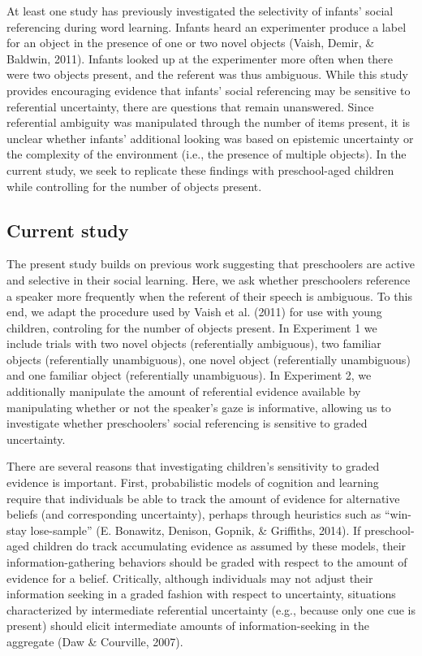 \documentclass[english,man]{apa6}
\theoremstyle{definition}
\theoremstyle{definition}
\theoremstyle{definition}
\theoremstyle{remark}
\begin{document}
At least one study has previously investigated the selectivity of
infants' social referencing during word learning. Infants heard an
experimenter produce a label for an object in the presence of one or two
novel objects (Vaish, Demir, \& Baldwin, 2011). Infants looked up at the
experimenter more often when there were two objects present, and the
referent was thus ambiguous. While this study provides encouraging
evidence that infants' social referencing may be sensitive to
referential uncertainty, there are questions that remain unanswered.
Since referential ambiguity was manipulated through the number of items
present, it is unclear whether infants' additional looking was based on
epistemic uncertainty or the complexity of the environment (i.e., the
presence of multiple objects). In the current study, we seek to
replicate these findings with preschool-aged children while controlling
for the number of objects present.

\subsection{Current study}\label{current-study}

The present study builds on previous work suggesting that preschoolers
are active and selective in their social learning. Here, we ask whether
preschoolers reference a speaker more frequently when the referent of
their speech is ambiguous. To this end, we adapt the procedure used by
Vaish et al. (2011) for use with young children, controling for the
number of objects present. In Experiment 1 we include trials with two
novel objects (referentially ambiguous), two familiar objects
(referentially unambiguous), one novel object (referentially
unambiguous) and one familiar object (referentially unambiguous). In
Experiment 2, we additionally manipulate the amount of referential
evidence available by manipulating whether or not the speaker's gaze is
informative, allowing us to investigate whether preschoolers' social
referencing is sensitive to graded uncertainty.

There are several reasons that investigating children's sensitivity to
graded evidence is important. First, probabilistic models of cognition
and learning require that individuals be able to track the amount of
evidence for alternative beliefs (and corresponding uncertainty),
perhaps through heuristics such as \enquote{win-stay lose-sample} (E.
Bonawitz, Denison, Gopnik, \& Griffiths, 2014). If preschool-aged
children do track accumulating evidence as assumed by these models,
their information-gathering behaviors should be graded with respect to
the amount of evidence for a belief. Critically, although individuals
may not adjust their information seeking in a graded fashion with
respect to uncertainty, situations characterized by intermediate
referential uncertainty (e.g., because only one cue is present) should
elicit intermediate amounts of information-seeking in the aggregate (Daw
\& Courville, 2007).
\end{document}

